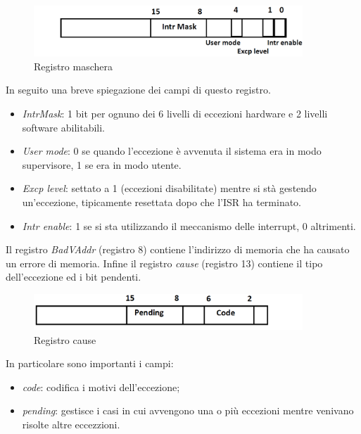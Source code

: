 \documentclass[class=book, crop=false, oneside]{standalone}
\begin{document}
\begin{figure}[!h]
	\centering
	\includegraphics[width=0.9\textwidth,keepaspectratio]{registro-maschera}
	\caption{Registro maschera}
\end{figure}
In seguito una breve spiegazione dei campi di questo registro.
\begin{itemize}
	\item \emph{IntrMask}:  1 bit per ognuno dei 6 livelli di eccezioni hardware e 2 livelli software abilitabili.
	\item \emph{User mode}: 0 se quando l'eccezione è avvenuta il sistema era in modo supervisore, 1 se era in modo utente.
	\item \emph{Excp level}: settato a 1 (eccezioni disabilitate) mentre si stà gestendo un'eccezione, tipicamente resettata dopo che l'ISR ha terminato.
	\item \emph{Intr enable}: 1 se si sta utilizzando il meccanismo delle interrupt, 0 altrimenti.
\end{itemize}
Il registro \emph{BadVAddr} (registro 8) contiene l'indirizzo di memoria che ha causato un errore di memoria. Infine il registro \emph{cause} (registro 13) contiene il tipo dell'eccezione ed i bit pendenti.

\begin{figure}[!h]
	\centering
	\includegraphics[width=0.9\textwidth,keepaspectratio]{registro-cause}
	\caption{Registro cause}
\end{figure}
In particolare sono importanti i campi:
\begin{itemize}
	\item \emph{code}: codifica i motivi dell'eccezione;
	\item \emph{pending}: gestisce i casi in cui avvengono una o più eccezioni mentre venivano risolte altre eccezzioni.
\end{itemize}
\end{document}
